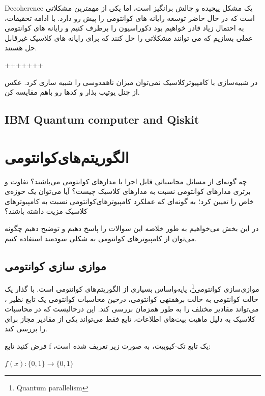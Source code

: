 \documentclass{book}
\begin{document}
Decoherence یک مشکل پیچیده و چالش برانگیز است، اما یکی از مهمترین مشکلاتی است که در حال حاضر توسعه رایانه های کوانتومی را پیش رو دارد. با ادامه تحقیقات، به احتمال زیاد قادر خواهیم بود دکوراسیون را برطرف کنیم و رایانه های کوانتومی عملی بسازیم که می توانند مشکلاتی را حل کنند که برای رایانه های کلاسیک غیرقابل حل هستند.

+++++++

در شبیه‌سازی با کامپیوترکلاسیک نمی‌توان میزان ناهمدوسی را شبیه سازی کرد. 
عکس از چنل یوتیب بذار و کدها رو باهم مقایسه کن.

\newpage


\section{IBM Quantum computer and Qiskit}
\newpage



\chapter{الگوریتم‌های‌کوانتومی‌}


چه گونه‌ای از مسائل محاسباتی قابل اجرا با مدارهای کوانتومی می‌باشند؟ 
تفاوت و برتری مدار‌های کوانتومی نسبت به مدار‌های کلاسیک چیست؟
آیا می‌توان یک حوزه‌ی خاص را تعیین کرد؛ به گونه‌ای که عملکرد کامپیوترهای‌‌کوانتومی نسبت به کامپیوتر‌های کلاسیک مزیت داشته باشند؟

در این بخش می‌خواهیم به طور خلاصه این سوالات را پاسخ دهیم و توضیح دهیم چگونه می‌توان از کامپیوتر‌های کوانتومی به شکلی سودمند استفاده کنیم.

\section{موازی سازی کوانتومی}

موازی‌سازی کوانتومی\footnote{Quantum parallelism}، پایه‌واساس بسیاری از الگوریتم‌های کوانتومی است. با گذار یک حالت کوانتومی به حالت برهمنهی کوانتومی، درحین محاسبات کوانتومی یک تابع نظیر ، می‌تواند مقادیر مختلف  را به طور همزمان بررسی کند. این درحالیست که در محاسبات کلاسیک به دلیل ماهیت بیت‌های اطلاعات، تابع  فقط می‌تواند یکی از مقادیر مجاز برای  را بررسی کند.


فرض کنید تابع f ،یک تابع تک-کیوبیت، به صورت زیر تعریف شده است:\\
\begin{center}
	$f (x) : \{0, 1\} \rightarrow \{0, 1\}$\\
\end{center}
\end{document}
